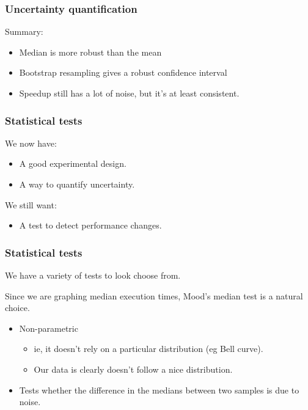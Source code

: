 \documentclass[10pt,aspectratio=169]{beamer}
\begin{document}
\begin{frame}
    \frametitle{Uncertainty quantification}

    Summary:

    \bigskip
    \begin{itemize}
    \item Median is more robust than the mean
      \medskip
    \item Bootstrap resampling gives a robust confidence interval
      \medskip
    \item Speedup still has a lot of noise, but it's at least consistent.
    \end{itemize}
    
\end{frame}

\begin{frame}
    \frametitle{Statistical tests}

    We now have:
    \begin{itemize}
    \item A good experimental design.
    \item A way to quantify uncertainty.
    \end{itemize}

    \bigskip

    We still want:
    \begin{itemize}
    \item A test to detect performance changes.
    \end{itemize}
    
\end{frame}


\begin{frame}
    \frametitle{Statistical tests}

    We have a variety of tests to look choose from.

    \bigskip

    Since we are graphing median execution times, Mood's median test
    is a natural choice.

    \bigskip

    \begin{itemize}
    \item Non-parametric
      \begin{itemize}
      \item ie, it doesn't rely on a particular distribution (eg Bell
        curve).
      \item Our data is clearly doesn't follow a nice distribution.
      \end{itemize}
    \item Tests whether the difference in the medians between two
      samples is due to noise.
    \end{itemize}

\end{frame}
    
\end{document}
